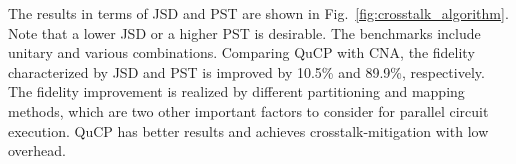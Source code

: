 \documentclass[conference]{IEEEtran}
\begin{document}
The results in terms of JSD and PST are shown in Fig.~\ref{fig:crosstalk_algorithm}. Note that a lower JSD or a higher PST is desirable. The benchmarks include unitary and various combinations. Comparing QuCP with CNA, the fidelity characterized by JSD and PST is improved by 10.5\% and 89.9\%, respectively. The fidelity improvement is realized by different partitioning and mapping methods, which are two other important factors to consider for parallel circuit execution. QuCP has better results and achieves crosstalk-mitigation with low overhead. 
%
%
\end{document}
